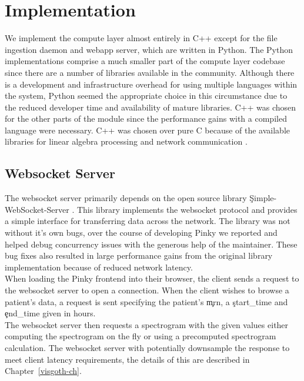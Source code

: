 \section{Implementation}

We implement the compute layer almost entirely in C++ except for the file
ingestion daemon and webapp server, which are written in Python. The Python
implementations comprise a much smaller part of the compute layer codebase
since there are a number of libraries available in the community. Although
there is a development and infrastructure overhead for using multiple languages
within the system, Python seemed the appropriate choice in this circumstance
due to the reduced developer time and availability of mature libraries. C++ was
chosen for the other parts of the module since the performance gains with a
compiled language were necessary. C++ was chosen over pure C because of the
available libraries for linear algebra processing \cite{arma} and network
communication \cite{websocket-server}.

\subsection{Websocket Server}\label{compute-ch:implementation-ws-server}

The websocket server primarily depends on the open source library
\c{Simple-WebSocket-Server} \cite{websocket-server}. This library implements
the websocket protocol and provides a simple interface for transferring data
across the network. The library was not without it's own bugs, over the course
of developing Pinky we reported and helped debug concurrency issues with the
generous help of the maintainer.  These bug fixes also resulted in large
performance gains from the original library implementation because of reduced
network latency.  \\

When loading the Pinky frontend into their browser, the client sends a request
to the websocket server to open a connection. When the client wishes to browse
a patient's data, a request is sent specifying the patient's \c{mrn}, a
\c{start\_time} and \c{end\_time} given in hours. \\

The websocket server then requests a spectrogram with the given values either
computing the spectrogram on the fly or using a precomputed spectrogram
calculation. The websocket server with potentially downsample the response to
meet client latency requirements, the details of this are described in
Chapter~\ref{visgoth-ch}. \\


